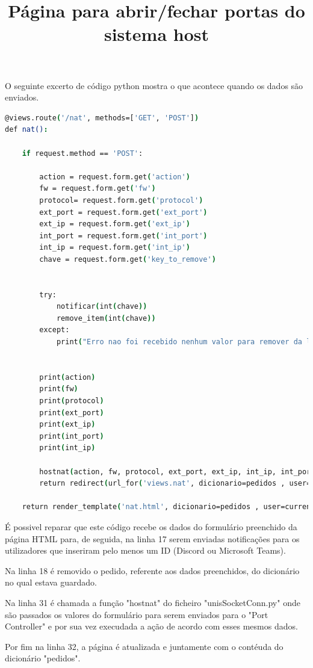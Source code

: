O seguinte excerto de código python mostra o que acontece quando os dados são enviados.
\begin{lstlisting}[language=csh, caption={Código em python da interface web}]
@views.route('/nat', methods=['GET', 'POST']) 
def nat():

    if request.method == 'POST':
        
        action = request.form.get('action')
        fw = request.form.get('fw')
        protocol= request.form.get('protocol')
        ext_port = request.form.get('ext_port')
        ext_ip = request.form.get('ext_ip')
        int_port = request.form.get('int_port')
        int_ip = request.form.get('int_ip')
        chave = request.form.get('key_to_remove')
        
        
        try:
            notificar(int(chave))
            remove_item(int(chave))
        except:
            print("Erro nao foi recebido nenhum valor para remover da lista de pedidos")


        print(action)
        print(fw)
        print(protocol)
        print(ext_port)
        print(ext_ip)
        print(int_port)
        print(int_ip)
        
        hostnat(action, fw, protocol, ext_port, ext_ip, int_ip, int_port)
        return redirect(url_for('views.nat', dicionario=pedidos , user=current_user))

    return render_template('nat.html', dicionario=pedidos , user=current_user)
\end{lstlisting}

É possivel reparar que este código recebe os dados do formulário preenchido da página HTML
para, de seguida, na linha 17 serem enviadas notificações para os utilizadores que inseriram
pelo menos um ID (Discord ou Microsoft Teams).

Na linha 18 é removido o pedido, referente aos dados preenchidos, do dicionário no qual estava guardado.

Na linha 31 é chamada a função "hostnat" do ficheiro "unisSocketConn.py" onde são passados 
os valores do formulário para serem enviados para o "Port Controller" e por sua vez execudada
a ação de acordo com esses mesmos dados.

Por fim na linha 32, a página é atualizada e juntamente com o contéuda do dicionário "pedidos".





\title*{\textbf{Página para abrir/fechar portas do sistema host}}

